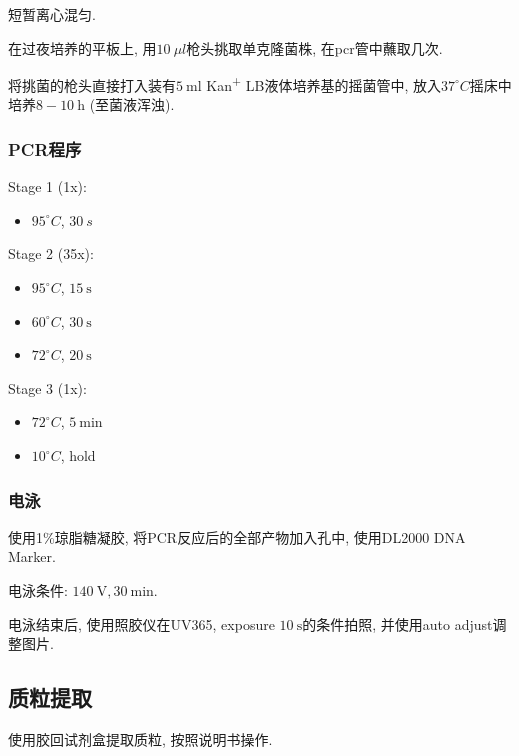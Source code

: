 \documentclass{article}
\begin{document}
短暂离心混匀.

在过夜培养的平板上, 用$10\ \mu l$枪头挑取单克隆菌株, 在pcr管中蘸取几次.

将挑菌的枪头直接打入装有$5\ \mbox{ml}$ Kan\textsuperscript{+} LB液体培养基的摇菌管中, 放入$37^\circ C$摇床中培养$8-10\ \mbox{h}$ (至菌液浑浊).

\subsubsection{PCR程序}

Stage 1 (1x):
\begin{itemize}
    \item $95^\circ C$, $30\ s$
\end{itemize}

Stage 2 (35x):
\begin{itemize}
    \item $95^\circ C$, $15\ \mbox{s}$
    \item $60^\circ C$, $30\ \mbox{s}$
    \item $72^\circ C$, $20\ \mbox{s}$
\end{itemize}

Stage 3 (1x):
\begin{itemize}
    \item $72^\circ C$, $5\ \mbox{min}$
    \item $10^\circ C$, hold
\end{itemize}

\subsubsection{电泳}

使用1\%琼脂糖凝胶, 将PCR反应后的全部产物加入孔中, 使用DL2000 DNA Marker.

电泳条件: $140\ \mbox{V}, 30\ \mbox{min}$.

电泳结束后, 使用照胶仪在UV365, exposure $10\ \mbox{s}$的条件拍照, 并使用auto adjust调整图片.

\subsection{质粒提取}

使用胶回试剂盒提取质粒, 按照说明书操作.
\end{document}
